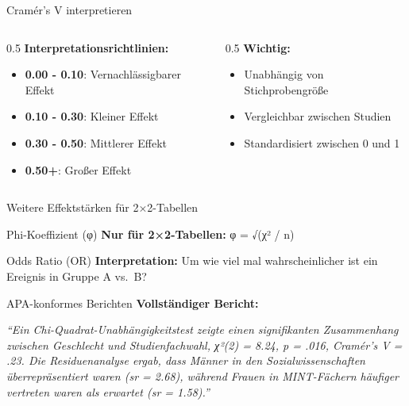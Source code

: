 \documentclass[
  ignorenonframetext,
]{beamer}
\providecommand{\tightlist}{%
  \setlength{\itemsep}{0pt}\setlength{\parskip}{0pt}}
\begin{document}
\begin{frame}{Cramér's V interpretieren}
\protect{}\label{cramuxe9rs-v-interpretieren}
\begin{columns}[T]
\begin{column}{0.5\linewidth}
\textbf{Interpretationsrichtlinien:}

\begin{itemize}
\tightlist
\item
  \textbf{0.00 - 0.10}: Vernachlässigbarer Effekt
\item
  \textbf{0.10 - 0.30}: Kleiner Effekt
\item
  \textbf{0.30 - 0.50}: Mittlerer Effekt
\item
  \textbf{0.50+}: Großer Effekt
\end{itemize}
\end{column}

\begin{column}{0.5\linewidth}
\textbf{Wichtig:}

\begin{itemize}
\tightlist
\item
  Unabhängig von Stichprobengröße
\item
  Vergleichbar zwischen Studien
\item
  Standardisiert zwischen 0 und 1
\end{itemize}
\end{column}
\end{columns}
\end{frame}

\begin{frame}{Weitere Effektstärken für 2×2-Tabellen}
\protect{}\label{weitere-effektstuxe4rken-fuxfcr-22-tabellen}
\begin{block}{Phi-Koeffizient (φ)}
\protect{}\label{phi-koeffizient-ux3c6}
\textbf{Nur für 2×2-Tabellen:} φ = √(χ² / n)
\end{block}

\begin{block}{Odds Ratio (OR)}
\protect{}\label{odds-ratio-or}
\textbf{Interpretation:} Um wie viel mal wahrscheinlicher ist ein
Ereignis in Gruppe A vs.~B?
\end{block}
\end{frame}

\begin{frame}{APA-konformes Berichten}
\protect{}\label{apa-konformes-berichten}
\textbf{Vollständiger Bericht:}

\emph{``Ein Chi-Quadrat-Unabhängigkeitstest zeigte einen signifikanten
Zusammenhang zwischen Geschlecht und Studienfachwahl, χ²(2) = 8.24, p =
.016, Cramér's V = .23. Die Residuenanalyse ergab, dass Männer in den
Sozialwissenschaften überrepräsentiert waren (sr = 2.68), während Frauen
in MINT-Fächern häufiger vertreten waren als erwartet (sr = 1.58).''}
\end{frame}
\end{document}

